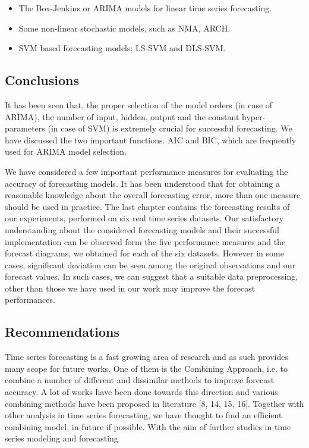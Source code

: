 \documentclass[
  onepage,
  openany]{scrbook}
\providecommand{\tightlist}{%
  \setlength{\itemsep}{0pt}\setlength{\parskip}{0pt}}\usepackage{longtable,booktabs,array}
\begin{document}
\begin{itemize}
\tightlist
\item
  The Box-Jenkins or ARIMA models for linear time series forecasting.
\item
  Some non-linear stochastic models, such as NMA, ARCH.
\item
  SVM based forecasting models; LS-SVM and DLS-SVM.
\end{itemize}

\hypertarget{conclusions}{%
\subsection{Conclusions}\label{conclusions}}

It has been seen that, the proper selection of the model orders (in case
of ARIMA), the number of input, hidden, output and the constant
hyper-parameters (in case of SVM) is extremely crucial for successful
forecasting. We have discussed the two important functions. AIC and BIC,
which are frequently used for ARIMA model selection.

We have considered a few important performance measures for evaluating
the accuracy of forecasting models. It has been understood that for
obtaining a reasonable knowledge about the overall forecasting error,
more than one measure should be used in practice. The last chapter
contains the forecasting results of our experiments, performed on six
real time series datasets. Our satisfactory understanding about the
considered forecasting models and their successful implementation can be
observed form the five performance measures and the forecast diagrams,
we obtained for each of the six datasets. However in some cases,
significant deviation can be seen among the original observations and
our forecast values. In such cases, we can suggest that a suitable data
preprocessing, other than those we have used in our work may improve the
forecast performances.

\hypertarget{recommendations}{%
\subsection{Recommendations}\label{recommendations}}

Time series forecasting is a fast growing area of research and as such
provides many scope for future works. One of them is the Combining
Approach, i.e. to combine a number of different and dissimilar methods
to improve forecast accuracy. A lot of works have been done towards this
direction and various combining methods have been proposed in literature
{[}8, 14, 15, 16{]}. Together with other analysis in time series
forecasting, we have thought to find an efficient combining model, in
future if possible. With the aim of further studies in time series
modeling and forecasting
\end{document}
